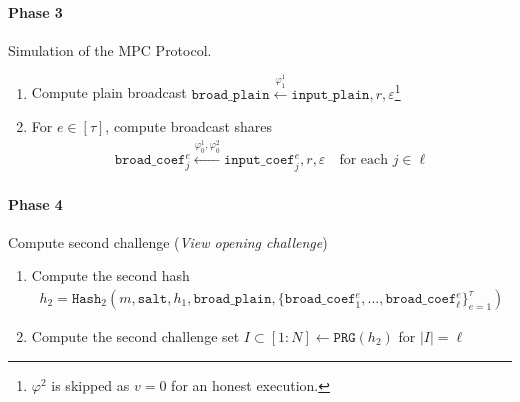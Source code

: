 \documentclass[11pt]{report}
\theoremstyle{definition}
\theoremstyle{plain}
\begin{document}
\begin{protocol}
  \paragraph{Phase 3} Simulation of the MPC Protocol.
  \begin{enumerate}[itemsep=0pt, topsep=0pt, parsep=0pt]
    \item Compute plain broadcast $\texttt{broad\_plain} \stackrel{\varphi^1_1}{\longleftarrow} \texttt{input\_plain}, r, \varepsilon$\footnote{$\varphi^2$ is skipped as $v = 0$ for an honest execution.}
    \item For $e \in [\tau]$, compute broadcast shares
          \begin{align*}
            \texttt{broad\_coef}_j^e \stackrel{\varphi^1_0, \varphi^2_0}{\longleftarrow} \texttt{input\_coef}_j^e, r, \varepsilon \quad \text{for each } j \in \ell
          \end{align*}
  \end{enumerate}

  \paragraph{Phase 4} Compute second challenge (\textit{View opening challenge})
  \begin{enumerate}[itemsep=0pt, topsep=0pt, parsep=0pt]
    \item Compute the second hash
          \begin{align*}
            h_2 = \texttt{Hash}_2(m, \texttt{salt}, h_1, \texttt{broad\_plain}, \{\texttt{broad\_coef}^e_1, \dots, \texttt{broad\_coef}^e_\ell\}_{e=1}^\tau)
          \end{align*}
    \item Compute the second challenge set $I \subset [1:N] \leftarrow \texttt{PRG}(h_2)$ for $|I| = \ell$
  \end{enumerate}


\end{protocol}
\end{document}
